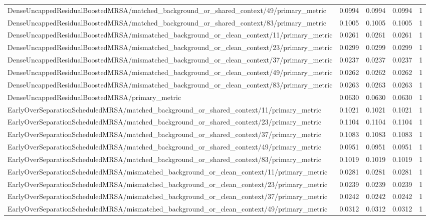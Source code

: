 \begin{table}[h]
\begin{tabular}{lrrrr}
DenseUncappedResidualBoostedMRSA/matched_background_or_shared_context/49/primary_metric & 0.0994 & 0.0994 & 0.0994 & 1 \\
DenseUncappedResidualBoostedMRSA/matched_background_or_shared_context/83/primary_metric & 0.1005 & 0.1005 & 0.1005 & 1 \\
DenseUncappedResidualBoostedMRSA/mismatched_background_or_clean_context/11/primary_metric & 0.0261 & 0.0261 & 0.0261 & 1 \\
DenseUncappedResidualBoostedMRSA/mismatched_background_or_clean_context/23/primary_metric & 0.0299 & 0.0299 & 0.0299 & 1 \\
DenseUncappedResidualBoostedMRSA/mismatched_background_or_clean_context/37/primary_metric & 0.0237 & 0.0237 & 0.0237 & 1 \\
DenseUncappedResidualBoostedMRSA/mismatched_background_or_clean_context/49/primary_metric & 0.0262 & 0.0262 & 0.0262 & 1 \\
DenseUncappedResidualBoostedMRSA/mismatched_background_or_clean_context/83/primary_metric & 0.0263 & 0.0263 & 0.0263 & 1 \\
DenseUncappedResidualBoostedMRSA/primary_metric & 0.0630 & 0.0630 & 0.0630 & 1 \\
EarlyOverSeparationScheduledMRSA/matched_background_or_shared_context/11/primary_metric & 0.1021 & 0.1021 & 0.1021 & 1 \\
EarlyOverSeparationScheduledMRSA/matched_background_or_shared_context/23/primary_metric & 0.1104 & 0.1104 & 0.1104 & 1 \\
EarlyOverSeparationScheduledMRSA/matched_background_or_shared_context/37/primary_metric & 0.1083 & 0.1083 & 0.1083 & 1 \\
EarlyOverSeparationScheduledMRSA/matched_background_or_shared_context/49/primary_metric & 0.0951 & 0.0951 & 0.0951 & 1 \\
EarlyOverSeparationScheduledMRSA/matched_background_or_shared_context/83/primary_metric & 0.1019 & 0.1019 & 0.1019 & 1 \\
EarlyOverSeparationScheduledMRSA/mismatched_background_or_clean_context/11/primary_metric & 0.0281 & 0.0281 & 0.0281 & 1 \\
EarlyOverSeparationScheduledMRSA/mismatched_background_or_clean_context/23/primary_metric & 0.0239 & 0.0239 & 0.0239 & 1 \\
EarlyOverSeparationScheduledMRSA/mismatched_background_or_clean_context/37/primary_metric & 0.0242 & 0.0242 & 0.0242 & 1 \\
EarlyOverSeparationScheduledMRSA/mismatched_background_or_clean_context/49/primary_metric & 0.0312 & 0.0312 & 0.0312 & 1 \\

\end{tabular}
\end{table}
